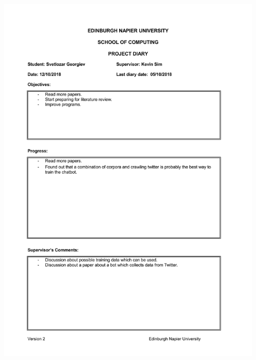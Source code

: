 \documentclass[12pt,a4paper]{article}
\begin{document}
\begin{appendices}
\includegraphics[width=\textwidth,height=\textheight,keepaspectratio]{week5.jpg}
\newpage

\end{appendices}
\end{document}
